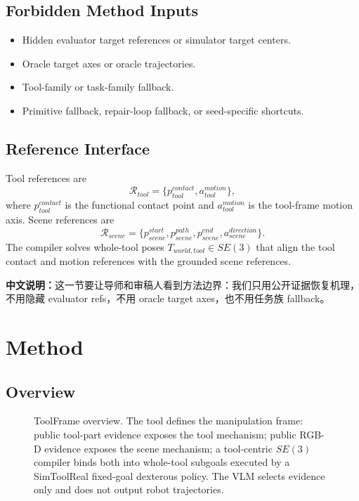 \documentclass[journal]{IEEEtran}
\newcommand{\method}{ToolFrame}
\newcommand{\cn}[1]{\par\smallskip\noindent\textbf{中文说明：}#1\par\smallskip}
\begin{document}
\subsection{Forbidden Method Inputs}
\begin{itemize}
  \item Hidden evaluator target references or simulator target centers.
  \item Oracle target axes or oracle trajectories.
  \item Tool-family or task-family fallback.
  \item Primitive fallback, repair-loop fallback, or seed-specific shortcuts.
\end{itemize}

\subsection{Reference Interface}
Tool references are
\begin{equation}
  \mathcal{R}_{tool} =
  \{p^{contact}_{tool}, a^{motion}_{tool}\},
\end{equation}
where $p^{contact}_{tool}$ is the functional contact point and
$a^{motion}_{tool}$ is the tool-frame motion axis. Scene references are
\begin{equation}
  \mathcal{R}_{scene} =
  \{p^{start}_{scene}, p^{path}_{scene}, p^{end}_{scene},
  a^{direction}_{scene}\}.
\end{equation}
The compiler solves whole-tool poses $T_{world,tool}\in SE(3)$ that align the
tool contact and motion references with the grounded scene references.

\cn{这一节要让导师和审稿人看到方法边界：我们只用公开证据恢复机理，不用隐藏 evaluator refs，不用 oracle target axes，也不用任务族 fallback。}

\section{Method}
\subsection{Overview}
\begin{figure}[t]
\centering
{}
\caption{\method{} overview. The tool defines the manipulation frame: public
tool-part evidence exposes the tool mechanism; public RGB-D evidence exposes
the scene mechanism; a tool-centric $SE(3)$ compiler binds both into whole-tool
subgoals executed by a SimToolReal fixed-goal dexterous policy. The VLM selects
evidence only and does not output robot trajectories.}
\label{fig:overview}
\end{figure}
\end{document}
